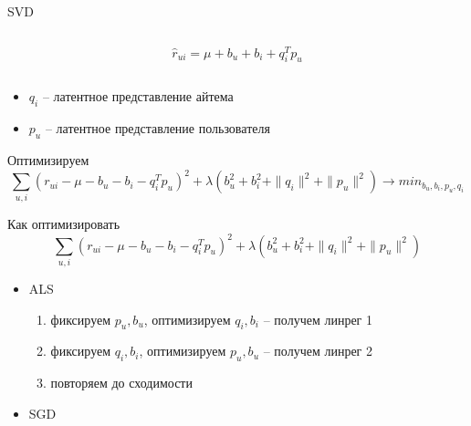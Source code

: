 \documentclass[11pt,aspectratio=169]{beamer}
\begin{document}
\begin{frame}{SVD}

\begin{columns}
\begin{column}{0.2\textwidth} 
\end{column}
\begin{column}{0.5\textwidth} 
\begin{tcolorbox}[colback=info!5,colframe=info!80,title=Модель]
\[
\hat r_{ui} = \mu + b_u + b_i + q_i^T p_u
\]
\end{tcolorbox}
\end{column}
\begin{column}{0.2\textwidth} 
\end{column}
\end{columns}

\vfill

\begin{itemize}
\item $q_i$ -- латентное представление айтема
\item $p_u$ -- латентное представление пользователя
\end{itemize}

\vfill

Оптимизируем
\[
\sum_{u, i} (r_{ui} - \mu - b_u - b_i - q_i^T p_u)^2 + \lambda (b_u^2 +  b_i^2 + \| q_i \|^2 + \| p_u \|^2) \rightarrow min_{b_u, b_i, p_u, q_i}
\]

\end{frame}

\begin{frame}{Как оптимизировать}
\[
\sum_{u, i} (r_{ui} - \mu - b_u - b_i - q_i^T p_u)^2 + \lambda (b_u^2 +  b_i^2 + \| q_i \|^2 + \| p_u \|^2)
\]

\begin{itemize}
\item ALS \cite{IMPLICIT}
\begin{enumerate}
\item фиксируем $p_u, b_u$, оптимизируем $q_i, b_i$ -- получем линрег 1
\item фиксируем  $q_i, b_i$, оптимизируем $p_u, b_u$ -- получем линрег 2
\item повторяем до сходимости
\end{enumerate}
\item SGD
\end{itemize}

\end{frame}
\end{document}
